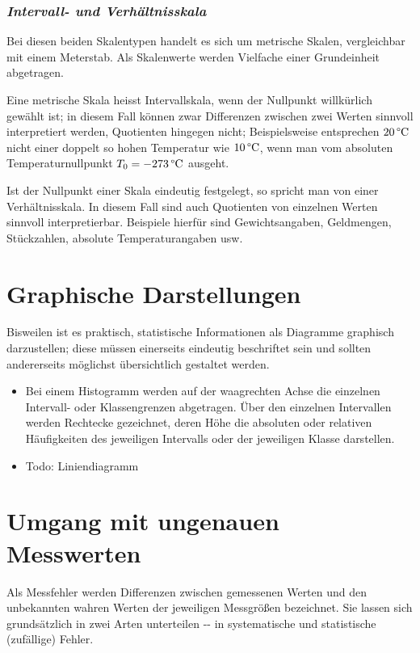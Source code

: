 \documentclass[a4paper]{article}
\providecommand*{\DUrubric}[2][class-arg]{%
  \subsubsection*{\centering\textit{\textmd{#2}}}}
\begin{document}
\DUrubric{Intervall- und Verhältnisskala}

Bei diesen beiden Skalentypen handelt es sich um metrische Skalen, vergleichbar
mit einem Meterstab. Als Skalenwerte werden Vielfache einer Grundeinheit
abgetragen.

Eine metrische Skala heisst Intervallskala, wenn der Nullpunkt willkürlich
gewählt ist; in diesem Fall können zwar Differenzen zwischen zwei Werten
sinnvoll interpretiert werden, Quotienten hingegen nicht; Beispielsweise
entsprechen $\unit[20]{\degree C}$ nicht einer doppelt so hohen Temperatur
wie $\unit[10]{\degree C}$, wenn man vom absoluten Temperaturnullpunkt
$T_0 = \unit[-273]{\degree C}$ ausgeht.

Ist der Nullpunkt einer Skala eindeutig festgelegt, so spricht man von einer
Verhältnisskala. In diesem Fall sind auch Quotienten von einzelnen Werten
sinnvoll interpretierbar. Beispiele hierfür sind Gewichtsangaben, Geldmengen,
Stückzahlen, absolute Temperaturangaben usw.



\section{Graphische Darstellungen%
  \label{id4}%
  \label{graphische-darstellungen}%
}

Bisweilen ist es praktisch, statistische Informationen als Diagramme graphisch
darzustellen; diese müssen einerseits eindeutig beschriftet sein und sollten
andererseits möglichst übersichtlich gestaltet werden.
%
\begin{itemize}

\item Bei einem Histogramm werden auf der waagrechten Achse die einzelnen Intervall-
oder Klassengrenzen abgetragen. Über den einzelnen Intervallen werden
Rechtecke gezeichnet, deren Höhe die absoluten oder relativen Häufigkeiten
des jeweiligen Intervalls oder der jeweiligen Klasse darstellen.

\item Todo: Liniendiagramm

\end{itemize}


\section{Umgang mit ungenauen Messwerten%
  \label{id5}%
  \label{umgang-mit-ungenauen-messwerten}%
}

Als Messfehler werden Differenzen zwischen gemessenen Werten und den unbekannten
wahren Werten der jeweiligen Messgrößen bezeichnet. Sie lassen sich
grundsätzlich in zwei Arten unterteilen -{}- in systematische und statistische
(zufällige) Fehler.
\end{document}
